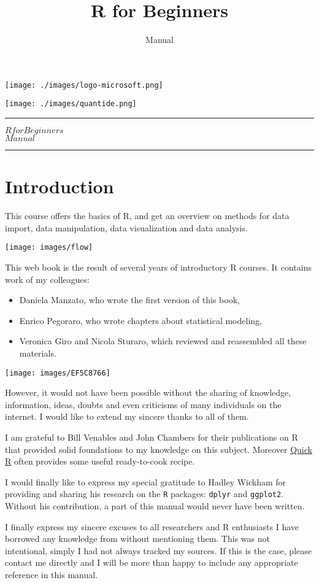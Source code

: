 \documentclass[]{book}
\title{R for Beginners}
\subtitle{Manual}
\author{}
\date{}
\providecommand{\tightlist}{%
  \setlength{\itemsep}{0pt}\setlength{\parskip}{0pt}}
\def\tightlist{}
\def\maketitle{%
  \null
  \thispagestyle{empty}%
   \begin{flushleft}\texttt{[image: ./images/logo-microsoft.png]}\end{flushleft}
  \vspace{-2cm}
  \begin{flushright}\texttt{[image: ./images/quantide.png]}\end{flushright}
  \vskip 5cm
  \hrule height 2pt
  \begin{center} \par \huge \strut \textbf{$R for Beginners$}\\ $Manual$ \par  \end{center}
  \vspace{0.5cm}
  \hrule height 2pt
  \vspace{0.5cm}
  \clearpage
}
\begin{document}
\maketitle

{
\setcounter{tocdepth}{1}
\tableofcontents
}
\chapter{Introduction}\label{introduction}

This course offers the basics of R, and get an overview on methods for
data import, data manipulation, data visualization and data analysis.

\texttt{[image: images/flow]}

This web book is the result of several years of introductory R courses.
It contains work of my colleagues:

\begin{itemize}
\tightlist
\item
  Daniela Manzato, who wrote the first version of this book,
\item
  Enrico Pegoraro, who wrote chapters about statistical modeling,
\item
  Veronica Giro and Nicola Sturaro, which reviewed and reassembled all
  these materials.
\end{itemize}

\texttt{[image: images/EF5C8766]}

However, it would not have been possible without the sharing of
knowledge, information, ideas, doubts and even criticisms of many
individuals on the internet. I would like to extend my sincere thanks to
all of them.

I am grateful to Bill Venables and John Chambers for their publications
on R that provided solid foundations to my knowledge on this subject.
Moreover \href{http://www.statmethods.net/}{Quick R} often provides some
useful ready-to-cook recipe.

I would finally like to express my special gratitude to Hadley Wickham
for providing and sharing his research on the \texttt{R} packages:
\texttt{dplyr} and \texttt{ggplot2}. Without his contribution, a part of
this manual would never have been written.

I finally express my sincere excuses to all researchers and R
enthusiasts I have borrowed any knowledge from without mentioning them.
This was not intentional, simply I had not always tracked my sources. If
this is the case, please contact me directly and I will be more than
happy to include any appropriate reference in this manual.
\end{document}
